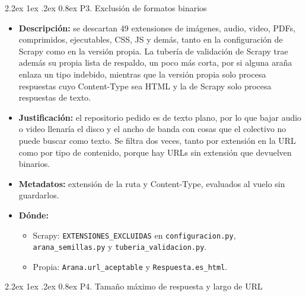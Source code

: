 \documentclass[11pt,spanish]{article}
\makeatletter
\renewcommand\paragraph{\@startsection{paragraph}{4}{\z@}%
  {2.2ex \@plus1ex \@minus.2ex}%
  {0.8ex}%
  {\normalfont\normalsize\bfseries}}
\makeatother
\begin{document}
\paragraph{P3. Exclusión de formatos binarios}

\begin{itemize}[label=\textbullet, leftmargin=*]
    \item \textbf{Descripción:} se descartan 49 extensiones de imágenes, audio, video, PDFs, comprimidos, ejecutables, CSS, JS y demás, tanto en la configuración de Scrapy como en la versión propia. La tubería de validación de Scrapy trae además su propia lista de respaldo, un poco más corta, por si alguna araña enlaza un tipo indebido, mientras que la versión propia solo procesa respuestas cuyo Content-Type sea HTML y la de Scrapy solo procesa respuestas de texto.
    \item \textbf{Justificación:} el repositorio pedido es de texto plano, por lo que bajar audio o video llenaría el disco y el ancho de banda con cosas que el colectivo no puede buscar como texto. Se filtra dos veces, tanto por extensión en la URL como por tipo de contenido, porque hay URLs sin extensión que devuelven binarios.
    \item \textbf{Metadatos:} extensión de la ruta y Content-Type, evaluados al vuelo sin guardarlos.
    \item \textbf{Dónde:}
    \begin{itemize}[label=--, leftmargin=*]
        \item Scrapy: \texttt{EXTENSIONES\_EXCLUIDAS} en \texttt{configuracion.py}, \texttt{arana\_semillas.py} y \texttt{tuberia\_validacion.py}.
        \item Propia: \texttt{Arana.url\_aceptable} y \texttt{Respuesta.es\_html}.
    \end{itemize}
\end{itemize}

\paragraph{P4. Tamaño máximo de respuesta y largo de URL}
\end{document}
